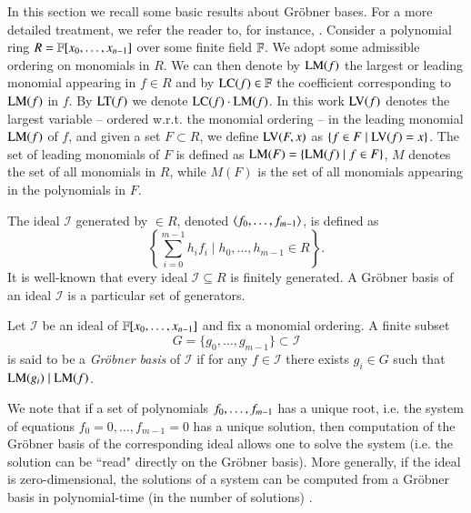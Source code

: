 In this section we recall some basic results about Gr\"obner bases. For a more detailed treatment, we refer the reader to, for instance, \cite{Cox1992}. Consider a polynomial ring $R = {\mathbb F}[x_0,\dots,x_{n-1}]$ over some finite field ${\mathbb F}$. We adopt some admissible ordering on monomials in $R$. We can then denote by $\textsc{LM}(f)$ the largest or leading monomial appearing in $f \in R$ and by $\textsc{LC}(f) \in {\mathbb F}$ the coefficient corresponding to $\textsc{LM}(f)$ in $f$. By $\textsc{LT}(f)$ we denote $\textsc{LC}(f) \cdot \textsc{LM}(f)$. In this work $\textsc{LV}(f)$ denotes the largest variable -- ordered w.r.t. the monomial ordering -- in the leading monomial $\textsc{LM}(f)$ of $f$, 
and given a set $F \subset R$, we define
$\textsc{LV}(F,x)$ as $\{f \in F \mid \textsc{LV}(f) = x\}$. 
The set of leading monomials of $F$ is defined as $\textsc{LM}(F) = \{\textsc{LM}(f) \mid f \in F\}$, $M$ denotes the set of all monomials in $R$, 
while $M(F)$ is the set of all monomials appearing in the polynomials in $F$. 

The ideal $\mathcal{I}$ generated by \sys $\in R$, denoted $\langle f_0,\ldots,f_{m-1}\rangle$, is defined 
as $$\left\{ \sum_{i=0}^{m-1} h_i f_i  \mid h_0 ,\dots , h_{m-1} \in R \right\}.$$ It is well-known that every ideal  $\mathcal{I} \subseteq R$ is finitely generated.
A Gr\"obner basis of an ideal $\mathcal{I}$ is a particular set of generators. 
\begin{definition}
Let $\mathcal{I}$ be an ideal of ${\mathbb F}[x_0,\dots,x_{n-1}]$ and fix a monomial ordering. A finite subset $$G = \{g_0 ,\dots , g_{m-1} \} \subset \mathcal{I}$$  is said to be a \emph{Gr\"obner basis} of $\mathcal{I}$ if for any $f \in \mathcal{I}$ there exists $g_i \in G$ such that $\textsc{LM}(g_i) \mid \textsc{LM}(f)$.
\end{definition}
We note that if a set of polynomials $f_0,\ldots,f_{m-1}$ has a unique root, i.e. the system of equations $f_0=0,\ldots,f_{m-1}=0$ has a unique solution, then computation of the Gr\"obner basis of the corresponding
ideal allows one to solve the system (i.e. the solution can be ``read" directly on the Gr\"obner basis).
More generally, if the ideal is zero-dimensional, the solutions of a system can be computed from a Gr\"obner basis in polynomial-time (in the number of solutions) \cite{FGLM}.
  
